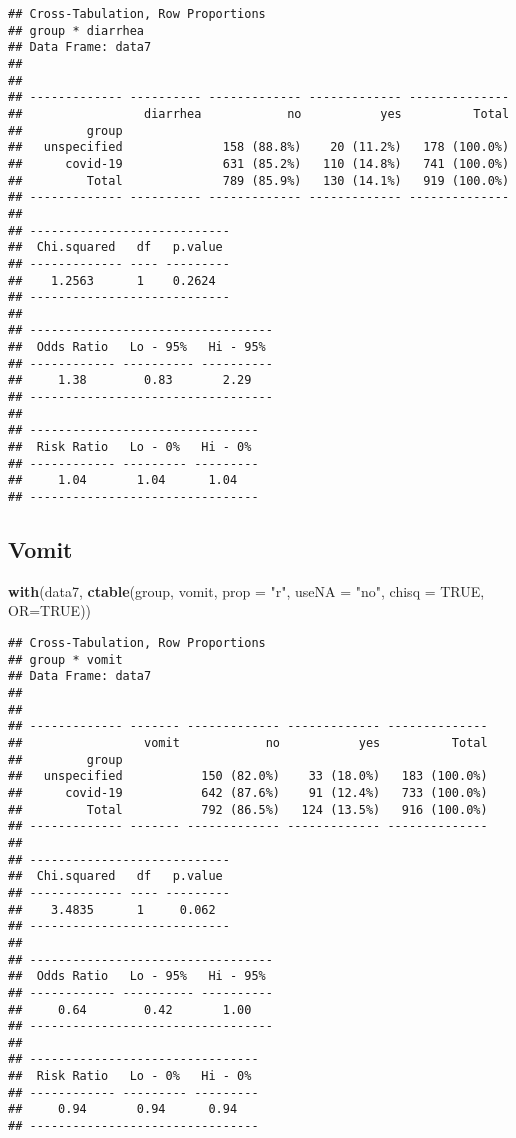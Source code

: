 \documentclass[
]{article}
\newenvironment{Shaded}{\begin{snugshade}}{\end{snugshade}}
\newcommand{\DataTypeTok}[1]{\textcolor[rgb]{0.13,0.29,0.53}{#1}}
\newcommand{\KeywordTok}[1]{\textcolor[rgb]{0.13,0.29,0.53}{\textbf{#1}}}
\newcommand{\NormalTok}[1]{#1}
\newcommand{\OtherTok}[1]{\textcolor[rgb]{0.56,0.35,0.01}{#1}}
\newcommand{\StringTok}[1]{\textcolor[rgb]{0.31,0.60,0.02}{#1}}
\begin{document}
\begin{verbatim}
## Cross-Tabulation, Row Proportions  
## group * diarrhea  
## Data Frame: data7  
## 
## 
## ------------- ---------- ------------- ------------- --------------
##                 diarrhea            no           yes          Total
##         group                                                      
##   unspecified              158 (88.8%)    20 (11.2%)   178 (100.0%)
##      covid-19              631 (85.2%)   110 (14.8%)   741 (100.0%)
##         Total              789 (85.9%)   130 (14.1%)   919 (100.0%)
## ------------- ---------- ------------- ------------- --------------
## 
## ----------------------------
##  Chi.squared   df   p.value 
## ------------- ---- ---------
##    1.2563      1    0.2624  
## ----------------------------
## 
## ----------------------------------
##  Odds Ratio   Lo - 95%   Hi - 95% 
## ------------ ---------- ----------
##     1.38        0.83       2.29   
## ----------------------------------
## 
## --------------------------------
##  Risk Ratio   Lo - 0%   Hi - 0% 
## ------------ --------- ---------
##     1.04       1.04      1.04   
## --------------------------------
\end{verbatim}

\hypertarget{vomit}{%
\subsection{Vomit}\label{vomit}}

\begin{Shaded}
\begin{Highlighting}[]
\KeywordTok{with}\NormalTok{(data7, }\KeywordTok{ctable}\NormalTok{(group, vomit, }\DataTypeTok{prop =} \StringTok{"r"}\NormalTok{, }\DataTypeTok{useNA =} \StringTok{"no"}\NormalTok{, }\DataTypeTok{chisq =} \OtherTok{TRUE}\NormalTok{, }\DataTypeTok{OR=}\OtherTok{TRUE}\NormalTok{))}
\end{Highlighting}
\end{Shaded}

\begin{verbatim}
## Cross-Tabulation, Row Proportions  
## group * vomit  
## Data Frame: data7  
## 
## 
## ------------- ------- ------------- ------------- --------------
##                 vomit            no           yes          Total
##         group                                                   
##   unspecified           150 (82.0%)    33 (18.0%)   183 (100.0%)
##      covid-19           642 (87.6%)    91 (12.4%)   733 (100.0%)
##         Total           792 (86.5%)   124 (13.5%)   916 (100.0%)
## ------------- ------- ------------- ------------- --------------
## 
## ----------------------------
##  Chi.squared   df   p.value 
## ------------- ---- ---------
##    3.4835      1     0.062  
## ----------------------------
## 
## ----------------------------------
##  Odds Ratio   Lo - 95%   Hi - 95% 
## ------------ ---------- ----------
##     0.64        0.42       1.00   
## ----------------------------------
## 
## --------------------------------
##  Risk Ratio   Lo - 0%   Hi - 0% 
## ------------ --------- ---------
##     0.94       0.94      0.94   
## --------------------------------
\end{verbatim}
\end{document}
